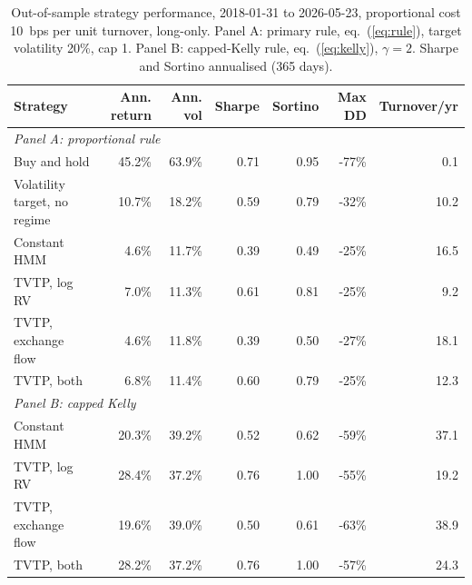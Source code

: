 \begin{table}[t]\centering\small
\caption{Out-of-sample strategy performance, 2018-01-31 to 2026-05-23, proportional cost 10~bps per unit turnover, long-only. Panel A: primary rule, eq.~(\ref{eq:rule}), target volatility 20\%, cap 1. Panel B: capped-Kelly rule, eq.~(\ref{eq:kelly}), $\gamma=2$. Sharpe and Sortino annualised (365 days).}\label{tab:strat}
\begin{tabular}{lrrrrrr}\toprule Strategy & Ann. return & Ann. vol & Sharpe & Sortino & Max DD & Turnover/yr \\ \midrule
\multicolumn{7}{l}{\textit{Panel A: proportional rule}} \\
\quad Buy and hold & 45.2\% & 63.9\% & 0.71 & 0.95 & -77\% & 0.1 \\
\quad Volatility target, no regime & 10.7\% & 18.2\% & 0.59 & 0.79 & -32\% & 10.2 \\
\quad Constant HMM & 4.6\% & 11.7\% & 0.39 & 0.49 & -25\% & 16.5 \\
\quad TVTP, log RV & 7.0\% & 11.3\% & 0.61 & 0.81 & -25\% & 9.2 \\
\quad TVTP, exchange flow & 4.6\% & 11.8\% & 0.39 & 0.50 & -27\% & 18.1 \\
\quad TVTP, both & 6.8\% & 11.4\% & 0.60 & 0.79 & -25\% & 12.3 \\
\multicolumn{7}{l}{\textit{Panel B: capped Kelly}} \\
\quad Constant HMM & 20.3\% & 39.2\% & 0.52 & 0.62 & -59\% & 37.1 \\
\quad TVTP, log RV & 28.4\% & 37.2\% & 0.76 & 1.00 & -55\% & 19.2 \\
\quad TVTP, exchange flow & 19.6\% & 39.0\% & 0.50 & 0.61 & -63\% & 38.9 \\
\quad TVTP, both & 28.2\% & 37.2\% & 0.76 & 1.00 & -57\% & 24.3 \\
\bottomrule\end{tabular}\end{table}
